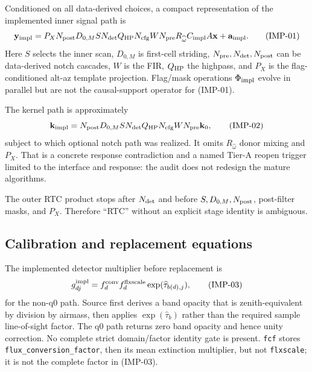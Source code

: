 \documentclass[11pt]{article}
\newcommand{\code}[1]{\nolinkurl{#1}}
\begin{document}
Conditioned on all data-derived choices, a compact representation of the
implemented inner signal path is
\begin{equation}
\mathbf y_{\rm impl}=
P_XN_{\rm post}D_{0,M}S N_{\rm det}Q_{\rm HP}N_{\rm cfg}W N_{\rm pre}
R_{\widehat\omega}C_{\rm impl}A\mathbf x+\mathbf a_{\rm impl}.
\tag{IMP-01}
\end{equation}
Here $S$ selects the inner scan, $D_{0,M}$ is first-cell striding,
$N_{\rm pre},N_{\rm det},N_{\rm post}$ can be data-derived notch cascades,
$W$ is the FIR, $Q_{\rm HP}$ the highpass, and $P_X$ is the flag-conditioned
alt-az template projection.  Flag/mask operations $\Phi_{\rm impl}$ evolve in
parallel but are not the causal-support operator for (IMP-01).

The kernel path is approximately
\begin{equation}
\mathbf k_{\rm impl}=
N_{\rm post}D_{0,M}S N_{\rm det}Q_{\rm HP}N_{\rm cfg}W N_{\rm pre}\mathbf k_0,
\tag{IMP-02}
\end{equation}
subject to which optional notch path was realized.  It omits
$R_{\widehat\omega}$ donor mixing and $P_X$.  That is a concrete response
contradiction and a named Tier-A reopen trigger limited to the interface and
response: the audit does not redesign the mature algorithms.

The outer RTC product stops after $N_{\rm det}$ and before $S,D_{0,M},
N_{\rm post}$, post-filter masks, and $P_X$.  Therefore ``RTC'' without an
explicit stage identity is ambiguous.

\subsection{Calibration and replacement equations}

The implemented detector multiplier before replacement is
\begin{equation}
g^{\rm impl}_{dj}=f^{\rm conv}_d f^{\rm flxscale}_d
\exp(\widehat\tau_{b(d),j}),
\tag{IMP-03}
\end{equation}
for the non-q0 path.  Source first derives a band opacity that is
zenith-equivalent by division by airmass, then applies $\exp(\widehat\tau_b)$
rather than the required sample line-of-sight factor.  The q0 path returns zero
band opacity and hence unity correction.  No complete strict domain/factor
identity gate is present.  \code{fcf} stores \code{flux_conversion_factor},
then its mean extinction multiplier, but not \code{flxscale}; it is not the
complete factor in (IMP-03).
\end{document}
